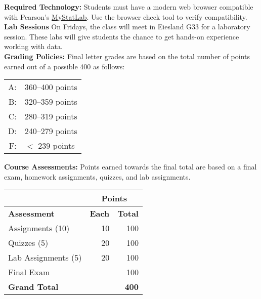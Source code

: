 \documentclass[10pt]{article}
\begin{document}
\textbf{Required Technology:} Students must have a modern web browser
compatible with Pearson's \href{mystatlab.com}{MyStatLab}.  Use the
browser check tool to verify compatibility.\\

\textbf{Lab Sessions}
On Fridays, the class will meet in Eiesland G33 for a laboratory
session.  These labs will give students the chance to get hands-on
experience working with data.\\

\textbf{Grading Policies:} Final letter grades are based on the total number
of points earned out of a possible 400 as follows:
\begin{center}\begin{tabular}{rl}
  A: & 360--400 points\\
  B: & 320--359 points\\
  C: & 280--319 points\\
  D: & 240--279 points\\
  F: & $<$ 239 points\\
\end{tabular}\end{center}

\textbf{Course Assessments:} Points earned towards the final total are
based on a final exam, homework assignments, quizzes, and lab assignments.
\begin{center}\begin{tabular}{l r r}
  & \multicolumn{2}{c}{\textbf{Points}} \\\hline
  \textbf{Assessment} & \textbf{Each} & \textbf{Total}\\\hline
  Assignments (10) & 10 & 100\\
  Quizzes (5) & 20 & 100\\
  Lab Assignments (5) & 20 & 100 \\
  Final Exam &  & 100 \\\hline
  \textbf{Grand Total} & & \textbf{400}\\
\end{tabular}\\\end{center}
\end{document}
